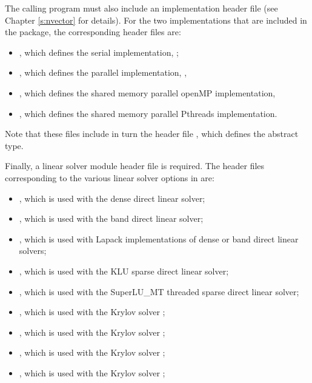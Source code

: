 The calling program must also include an {\nvector} implementation header file
(see Chapter \ref{s:nvector} for details).
For the two {\nvector} implementations that are included in the {\kinsol} package,
the corresponding header files are:
%
\begin{itemize}
\item {}, 
  which defines the serial implementation, {\nvecs};
\item {}, 
  which defines the parallel {\mpi} implementation, {\nvecp},
\item {},
  which defines the shared memory parallel openMP implementation,
\item {},
  which defines the shared memory parallel Pthreads implementation.
\end{itemize}
%
Note that these files include in turn the header file , which 
defines the abstract  type. 

Finally, a linear solver module header file is required. 
The header files corresponding to the various linear solver options in
{\kinsol} are:
\begin{itemize}
\item {},
  which is used with the dense direct linear solver;

\item {}, 
  which is used with the band direct linear solver;

\item {},
  which is used with Lapack implementations of dense or band direct linear solvers;

\item {},
  which is used with the KLU sparse direct linear solver;

\item {},
  which is used with the SuperLU\_MT threaded sparse direct linear solver;

\item {}, 
  which is used with the Krylov solver {\spgmr};

\item {}, 
  which is used with the Krylov solver {\spfgmr};

\item {}, 
  which is used with the Krylov solver {\spbcg};

\item {}, 
  which is used with the Krylov solver {\sptfqmr};

\end{itemize}

